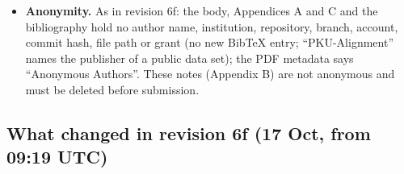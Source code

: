 \documentclass{article}
\theoremstyle{plain}
\theoremstyle{definition}
\theoremstyle{remark}
\begin{document}
\begin{itemize}
        folder \nolinkurl{rev6g/}: \nolinkurl{body_pages.py},
        \nolinkurl{heads.py} and \nolinkurl{short_lines55.py} unchanged;
        \nolinkurl{notes_md_to_tex.py} with the escape rule and its header
        comment; \nolinkurl{build.sh} and \nolinkurl{splice_notes.py} with the
        new folder; \nolinkurl{paper_to_pdf.py} with local KaTeX, its banner set
        to revision 6g. One script applied the body and Appendix C edits to the
        Markdown and the LaTeX, a second the move and the trims, a third the
        notes, and a fourth adds a revision 6g paragraph to the LaTeX file's
        header comment; each body change is a single-match replacement
        (whitespace-tolerant in the LaTeX), so the two files carry the same
        words.
  \item \textbf{Anonymity.} As in revision 6f: the body, Appendices A and C and
        the bibliography hold no author name, institution, repository, branch,
        account, commit hash, file path or grant (no new BibTeX entry;
        ``PKU-Alignment'' names the publisher of a public data set); the PDF
        metadata says ``Anonymous Authors''. These notes (Appendix B) are not
        anonymous and must be deleted before submission.
\end{itemize}

\subsection{What changed in revision 6f (17 Oct, from 09:19 UTC)}
\end{document}
